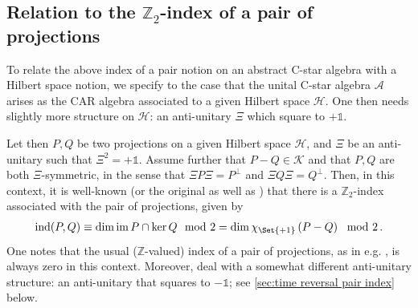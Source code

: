\documentclass[a4paper,10pt]{article}
\numberwithin{equation}{section}
\theoremstyle{plain}
\theoremstyle{plain}
\theoremstyle{plain}
\theoremstyle{plain}
\theoremstyle{plain}
\theoremstyle{remark}
\theoremstyle{definition}
\newcommand{\ZZ}{\mathbb{Z}}
\newcommand{\calA}{\mathcal{A}}
\newcommand{\calH}{\mathcal{H}}
\newcommand{\calK}{\mathcal{K}}
\newcommand{\Id}{\mathds{1}}
\newcommand{\findex}{\operatorname{ind}}
\newcommand{\im}{\operatorname{im}}
\newcommand{\eql}[1]{\begin{align}#1\end{align}}
\newcommand{\br}[1]{\left(#1\right)}
\begin{document}
\subsection{Relation to the $\ZZ_2$-index of a pair of projections}

To relate the above index of a pair notion on an abstract C-star algebra with a Hilbert space notion, we specify to the case that the unital C-star algebra $\calA$ arises as the CAR algebra associated to a given Hilbert space $\calH$. One then needs slightly more structure on $\calH$: an anti-unitary $\Xi$ which square to $+\Id$.

Let then $P,Q$ be two projections on a given Hilbert space $\calH$, and $\Xi$ be an anti-unitary such that $\Xi^2=+\Id$. Assume further that $P-Q\in\calK$ and that $P,Q$ are both $\Xi$-symmetric, in the sense that $\Xi P \Xi = P^\perp$ and $\Xi Q \Xi = Q^\perp$. Then, in this context, it is well-known \cite{KatsuraKoma2016} (or the original \cite{AtiyahSinger1969} as well as \cite{SchulzBaldes2015Z2Indices,FonsecaEtAl2020,ChungShapiro2023}) that there is a $\ZZ_2$-index associated with the pair of projections, given by 
\eql{
    \findex(P,Q) \equiv \dim \im P \cap\ker Q\mod 2 = \dim \chi_{\Set{+1}}\br{P-Q}\mod 2\,.
} One notes that the usual ($\ZZ$-valued) index of a pair of projections, as in e.g. \cite{Avron1994220}, is always zero in this context. Moreover, \cite{SchulzBaldes2015Z2Indices,KatsuraKoma2016,FonsecaEtAl2020} deal with a somewhat different anti-unitary structure: an anti-unitary that squares to $-\Id$; see \cref{sec:time reversal pair index} below.
\end{document}
